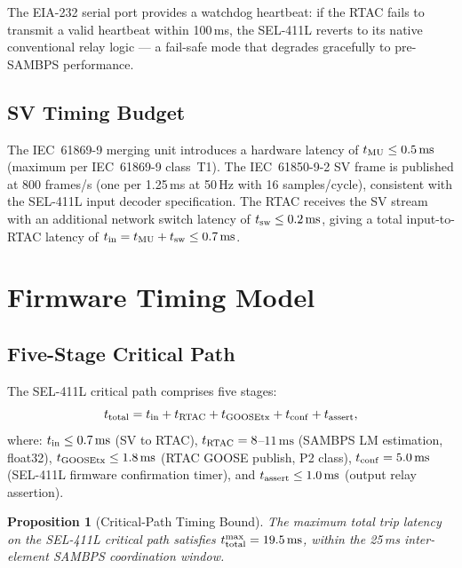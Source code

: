 \documentclass[journal,twoside]{IEEEtran}
\newtheorem{proposition}{Proposition}
\begin{document}
The EIA-232 serial port provides a watchdog heartbeat: if the RTAC fails to
transmit a valid heartbeat within 100\,ms, the SEL-411L reverts to its native
conventional relay logic --- a fail-safe mode that degrades gracefully to
pre-SAMBPS performance.

\subsection{SV Timing Budget}

The IEC~61869-9 merging unit introduces a hardware latency of
$t_{\rm MU} \leq 0.5\,\text{ms}$ (maximum per IEC~61869-9 class~T1).
The IEC~61850-9-2 SV frame is published at 800 frames/s (one per 1.25\,ms
at 50\,Hz with 16 samples/cycle), consistent with the SEL-411L input decoder
specification.
The RTAC receives the SV stream with an additional network switch latency of
$t_{\rm sw} \leq 0.2\,\text{ms}$, giving a total input-to-RTAC latency of
$t_{\rm in} = t_{\rm MU} + t_{\rm sw} \leq 0.7\,\text{ms}$.

\section{Firmware Timing Model}
\label{sec:timing}

\subsection{Five-Stage Critical Path}

The SEL-411L critical path comprises five stages:
\begin{equation}
  t_{\rm total} = t_{\rm in} + t_{\rm RTAC} + t_{\rm GOOSEtx}
                  + t_{\rm conf} + t_{\rm assert},
  \label{eq:critical_path}
\end{equation}
where:
$t_{\rm in} \leq 0.7\,\text{ms}$ (SV to RTAC),
$t_{\rm RTAC} = 8$--$11\,\text{ms}$ (SAMBPS LM estimation, float32),
$t_{\rm GOOSEtx} \leq 1.8\,\text{ms}$ (RTAC GOOSE publish, P2 class),
$t_{\rm conf} = 5.0\,\text{ms}$ (SEL-411L firmware confirmation timer), and
$t_{\rm assert} \leq 1.0\,\text{ms}$ (output relay assertion).

\begin{proposition}[Critical-Path Timing Bound]
\label{prop:timing}
The maximum total trip latency on the SEL-411L critical path satisfies
$t_{\rm total}^{\max} = 19.5\,\text{ms}$, within the 25\,ms inter-element
SAMBPS coordination window.
\end{proposition}
\end{document}
